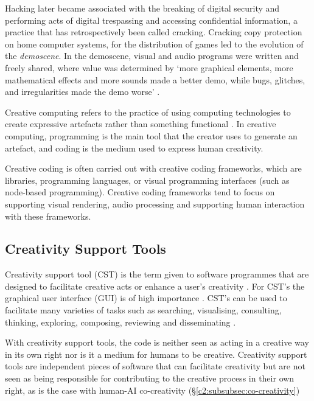 Hacking later became associated with the breaking of digital security and performing acts of digital trespassing and accessing confidential information, a practice that has retrospectively been called cracking. 
Cracking copy protection on home computer systems, for the distribution of games led to the evolution of the \textit{demoscene}. In the demoscene, visual and audio programs were written and freely shared, where value was determined by ‘more graphical elements, more mathematical effects and more sounds made a better demo, while bugs, glitches, and irregularities made the demo worse’ \citep{carlsson2019forgotten}.

Creative computing refers to the practice of using computing technologies to create expressive artefacts rather than something functional \citep{yang2016promoting}.
In creative computing, programming is the main tool that the creator uses to generate an artefact, and coding is the medium used to express human creativity. 

Creative coding is often carried out with creative coding frameworks, which are libraries, programming languages, or visual programming interfaces (such as node-based programming). 
Creative coding frameworks tend to focus on supporting visual rendering, audio processing and supporting human interaction with these frameworks. 


\subsection{Creativity Support Tools}
\label{c2:subsec:cst}

Creativity support tool (CST) is the term given to software programmes that are designed to facilitate creative acts or enhance a user's creativity \citep{shneiderman2002creativity}. 
For CST’s the graphical user interface (GUI) is of high importance \citep{shneiderman1999user}. 
CST’s can be used to facilitate many varieties of tasks such as searching, visualising, consulting, thinking, exploring, composing, reviewing and disseminating \citep{shneiderman2002cst_tutorial}.

With creativity support tools, the code is neither seen as acting in a creative way in its own right nor is it a medium for humans to be creative. 
Creativity support tools are independent pieces of software that can facilitate creativity but are not seen as being responsible for contributing to the creative process in their own right, as is the case with human-AI co-creativity (\S \ref{c2:subsubsec:co-creativity})

